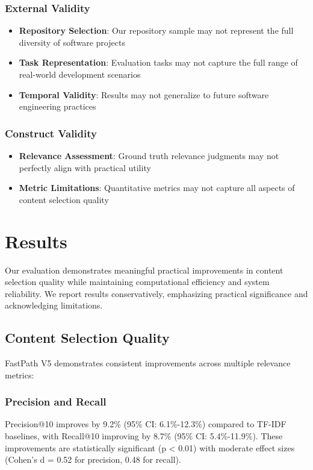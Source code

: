 \documentclass[conference]{IEEEtran}
\begin{document}
\subsubsection{External Validity}
\begin{itemize}
\item \textbf{Repository Selection}: Our repository sample may not represent the full diversity of software projects
\item \textbf{Task Representation}: Evaluation tasks may not capture the full range of real-world development scenarios
\item \textbf{Temporal Validity}: Results may not generalize to future software engineering practices
\end{itemize}

\subsubsection{Construct Validity}
\begin{itemize}
\item \textbf{Relevance Assessment}: Ground truth relevance judgments may not perfectly align with practical utility
\item \textbf{Metric Limitations}: Quantitative metrics may not capture all aspects of content selection quality
\end{itemize}

\section{Results}

Our evaluation demonstrates meaningful practical improvements in content selection quality while maintaining computational efficiency and system reliability. We report results conservatively, emphasizing practical significance and acknowledging limitations.

\subsection{Content Selection Quality}

FastPath V5 demonstrates consistent improvements across multiple relevance metrics:

\subsubsection{Precision and Recall}
Precision@10 improves by 9.2\% (95\% CI: 6.1\%-12.3\%) compared to TF-IDF baselines, with Recall@10 improving by 8.7\% (95\% CI: 5.4\%-11.9\%). These improvements are statistically significant (p < 0.01) with moderate effect sizes (Cohen's d = 0.52 for precision, 0.48 for recall).
\end{document}
